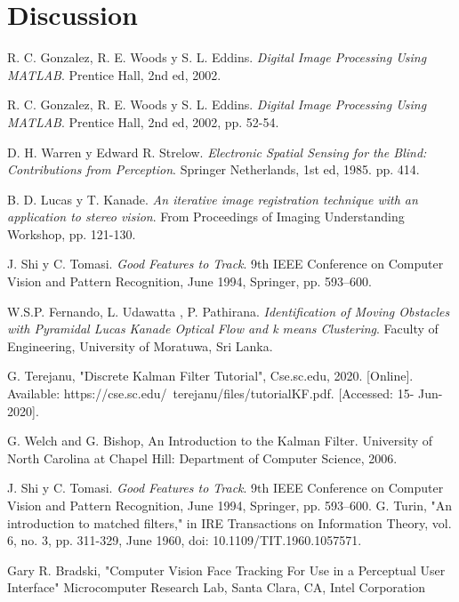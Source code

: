%

\section{Discussion}


\begin{thebibliography}{9}

R. C. Gonzalez, R. E. Woods y S. L. Eddins. \textit{Digital Image Processing Using MATLAB}. Prentice Hall, 2nd ed, 2002.%

R. C. Gonzalez, R. E. Woods y S. L. Eddins. \textit{Digital Image Processing Using MATLAB}. Prentice Hall, 2nd ed, 2002, pp. 52-54.

D. H. Warren y Edward R. Strelow. \textit{Electronic Spatial Sensing for the Blind: Contributions from Perception}. Springer Netherlands, 1st ed, 1985. pp. 414.

B. D. Lucas y T. Kanade. \textit{An iterative image registration technique with an application to stereo vision}. From Proceedings of Imaging Understanding Workshop, pp. 121-130.

J. Shi y C. Tomasi. \textit{Good Features to Track}. 9th IEEE Conference on Computer Vision and Pattern Recognition, June 1994, Springer, pp. 593–600.

W.S.P. Fernando, L. Udawatta , P. Pathirana. \textit{Identification of Moving Obstacles with Pyramidal
Lucas Kanade Optical Flow and k means
Clustering}. Faculty of Engineering, University of Moratuwa, Sri Lanka.

G. Terejanu, "Discrete Kalman Filter Tutorial", Cse.sc.edu, 2020. [Online]. Available: https://cse.sc.edu/~terejanu/files/tutorialKF.pdf. [Accessed: 15- Jun- 2020].

G. Welch and G. Bishop, An Introduction to the Kalman Filter. University of North Carolina at Chapel Hill: Department of Computer Science, 2006.

J. Shi y C. Tomasi. \textit{Good Features to Track}. 9th IEEE Conference on Computer Vision and Pattern Recognition, June 1994, Springer, pp. 593–600.
 G. Turin, "An introduction to matched filters," in IRE Transactions on Information Theory, vol. 6, no. 3, pp. 311-329, June 1960, doi: 10.1109/TIT.1960.1057571.
 
 Gary R. Bradski, "Computer Vision Face Tracking For Use in a Perceptual User
 Interface" Microcomputer Research Lab, Santa Clara, CA, Intel Corporation


\end{thebibliography}

